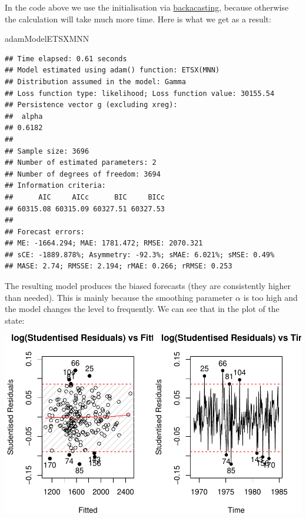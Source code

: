 \documentclass[
]{book}
\newenvironment{Shaded}{\begin{snugshade}}{\end{snugshade}}
\newcommand{\AttributeTok}[1]{\textcolor[rgb]{0.77,0.63,0.00}{#1}}
\newcommand{\DecValTok}[1]{\textcolor[rgb]{0.00,0.00,0.81}{#1}}
\newcommand{\FunctionTok}[1]{\textcolor[rgb]{0.00,0.00,0.00}{#1}}
\newcommand{\NormalTok}[1]{#1}
\newcommand{\SpecialCharTok}[1]{\textcolor[rgb]{0.00,0.00,0.00}{#1}}
\newcommand{\StringTok}[1]{\textcolor[rgb]{0.31,0.60,0.02}{#1}}
\theoremstyle{definition}
\theoremstyle{definition}
\theoremstyle{definition}
\theoremstyle{definition}
\theoremstyle{remark}
\begin{document}
In the code above we use the initialisation via \protect\hyperlink{ADAMInitialisationOptAndBack}{backacasting}, because otherwise the calculation will take much more time. Here is what we get as a result:

\begin{Shaded}
\begin{Highlighting}[]
\NormalTok{adamModelETSXMNN}
\end{Highlighting}
\end{Shaded}

\begin{verbatim}
## Time elapsed: 0.61 seconds
## Model estimated using adam() function: ETSX(MNN)
## Distribution assumed in the model: Gamma
## Loss function type: likelihood; Loss function value: 30155.54
## Persistence vector g (excluding xreg):
##  alpha 
## 0.6182 
## 
## Sample size: 3696
## Number of estimated parameters: 2
## Number of degrees of freedom: 3694
## Information criteria:
##      AIC     AICc      BIC     BICc 
## 60315.08 60315.09 60327.51 60327.53 
## 
## Forecast errors:
## ME: -1664.294; MAE: 1781.472; RMSE: 2070.321
## sCE: -1889.878%; Asymmetry: -92.3%; sMAE: 6.021%; sMSE: 0.49%
## MASE: 2.74; RMSSE: 2.194; rMAE: 0.266; rRMSE: 0.253
\end{verbatim}

The resulting model produces the biased forecasts (they are consistently higher than needed). This is mainly because the smoothing parameter \(\alpha\) is too high and the model changes the level to frequently. We can see that in the plot of the state:

\begin{Shaded}
\end{Shaded}

\includegraphics{adam_files/figure-latex/unnamed-chunk-106-1.pdf}
\end{document}
